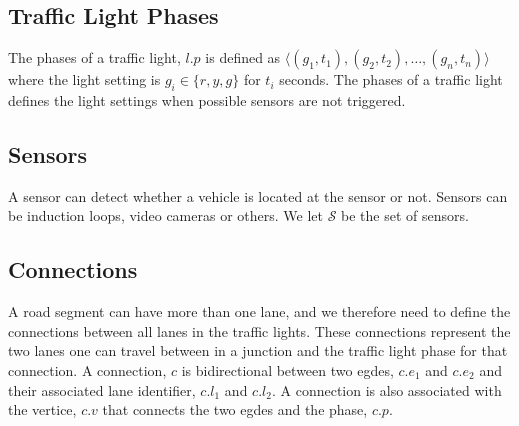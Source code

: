 \subsection{Traffic Light Phases}
The phases of a traffic light, $l.p$ is defined as $\langle(g_1, t_1),(g_2, t_2),\dots, (g_n, t_n) \rangle$ where the light setting is $g_i\in \{r, y, g\}$ for $t_i$ seconds.
The phases of a traffic light defines the light settings when possible sensors are not triggered. 
\begin{comment}
A traffic light controls the flow of traffic at a junction (vertice). 
There is a program of red, yellow and green light setting for each connection between two lanes in the junction.
We call this a program or \textit{phase}. A phase, $P$, is a sequence of light settings and time spans. A light setting can either be green, red or yellow. At a green light traffic is allowed to pass the junction along the connection, at red light, traffic is stopped, and a yellow light setting signals a change between red and green. Hence $P$ is defined as
\[
\mathcal{P} =\{ \langle(g_1, t_1),(g_2, t_2),\dots, (g_n, t_n) \rangle\mid g_i\in \{r, y, g\}, t_i\in \mathbb{N}\}
\]
\end{comment}

\subsection{Sensors}
A sensor can detect whether a vehicle is located at the sensor or not. Sensors can be induction loops, video cameras or others. We let $\mathcal{S}$ be the set of sensors.

\subsection{Connections}
A road segment can have more than one lane, and we therefore need to define the connections between all lanes in the traffic lights.
These connections represent the two lanes one can travel between in a junction and the traffic light phase for that connection.
A connection, $c$ is bidirectional between two egdes, $c.e_1$ and $c.e_2$ and their associated lane identifier, $c.l_1$ and $c.l_2$. A connection is also associated with the vertice, $c.v$ that connects the two egdes and the phase, $c.p$.

\begin{comment}
In addition to egdes and vertices, we define et set of connections between two egdes. These connections represent the two lanes one can travel between in a junction. Each connection has a phase of traffic light settings.Lanes are indexed from $0$, and the set of connections is defined as
\[
\mathcal{C}_{(V, E)} = \{(e_1, l_1, e_2, l_2, p) \mid e_1, e_2 \in E, l_1, l_2\in \mathbb{N}_0, p\in \mathcal{P}\}
\]
We assume that $e_1$ and $e_2$ are connected in $(V, E)$.
\end{comment}

